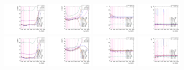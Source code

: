 \begin{figure}[htbp]
  \includegraphics[width=0.2\textwidth]{fig/analysisAppendix/paramSignalShape_allSig_MJJ_HP_nobb_LDy_mean.pdf}
  \includegraphics[width=0.2\textwidth]{fig/analysisAppendix/paramSignalShape_allSig_MJJ_HP_nobb_LDy_sigma.pdf}
  \includegraphics[width=0.2\textwidth]{fig/analysisAppendix/paramSignalShape_allSig_MJJ_HP_nobb_LDy_alpha.pdf}
  \includegraphics[width=0.2\textwidth]{fig/analysisAppendix/paramSignalShape_allSig_MJJ_HP_nobb_LDy_alpha2.pdf}\\
  \includegraphics[width=0.2\textwidth]{fig/analysisAppendix/paramSignalShape_allSig_MJJ_LP_nobb_LDy_mean.pdf}
  \includegraphics[width=0.2\textwidth]{fig/analysisAppendix/paramSignalShape_allSig_MJJ_LP_nobb_LDy_sigma.pdf}
  \includegraphics[width=0.2\textwidth]{fig/analysisAppendix/paramSignalShape_allSig_MJJ_LP_nobb_LDy_alpha.pdf}
  \includegraphics[width=0.2\textwidth]{fig/analysisAppendix/paramSignalShape_allSig_MJJ_LP_nobb_LDy_alpha2.pdf}\\

\end{figure}
